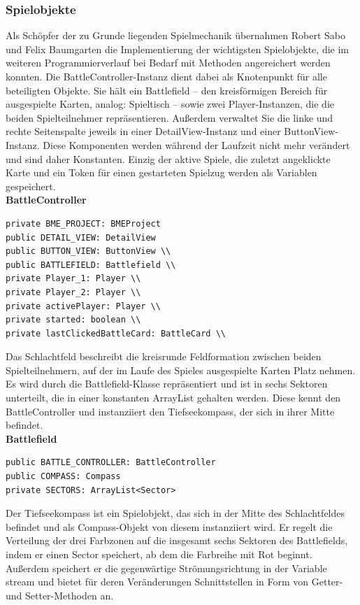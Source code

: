 \subsubsection{Spielobjekte}
Als Schöpfer der zu Grunde liegenden Spielmechanik übernahmen Robert Sabo und Felix Baumgarten die Implementierung der wichtigsten Spielobjekte, die im weiteren Programmierverlauf bei Bedarf mit Methoden angereichert werden konnten.
Die BattleController-Instanz dient dabei als Knotenpunkt für alle beteiligten Objekte. Sie hält ein Battlefield – den kreisförmigen Bereich für ausgespielte Karten, analog: Spieltisch – sowie zwei Player-Instanzen, die die beiden Spielteilnehmer repräsentieren. Außerdem verwaltet Sie die linke und rechte Seitenspalte jeweils in einer DetailView-Instanz und einer ButtonView-Instanz. Diese Komponenten werden während der Laufzeit nicht mehr verändert und sind daher Konstanten. Einzig der aktive Spiele, die zuletzt angeklickte Karte und ein Token für einen gestarteten Spielzug werden als Variablen gespeichert.
\\
\textbf{BattleController}
\begin{lstlisting}[frame=single]
private BME_PROJECT: BMEProject 
public DETAIL_VIEW: DetailView 
public BUTTON_VIEW: ButtonView \\
public BATTLEFIELD: Battlefield \\
private Player_1: Player \\
private Player_2: Player \\
private activePlayer: Player \\
private started: boolean \\
private lastClickedBattleCard: BattleCard \\
\end{lstlisting}

Das Schlachtfeld beschreibt die kreisrunde Feldformation zwischen beiden Spielteilnehmern, auf der im Laufe des Spieles ausgespielte Karten Platz nehmen. Es wird durch die Battlefield-Klasse repräsentiert und ist in sechs Sektoren unterteilt, die in einer konstanten ArrayList gehalten werden. Diese kennt den BattleController und instanziiert den Tiefseekompass, der sich in ihrer Mitte befindet.
\\
\textbf{Battlefield}
\begin{lstlisting}[frame=single]
public BATTLE_CONTROLLER: BattleController 
public COMPASS: Compass
private SECTORS: ArrayList<Sector>
\end{lstlisting}

Der Tiefseekompass ist ein Spielobjekt, das sich in der Mitte des Schlachtfeldes befindet und als Compass-Objekt von diesem instanziiert wird. Er regelt die Verteilung der drei Farbzonen auf die insgesamt sechs Sektoren des Battlefields, indem er einen Sector speichert, ab dem die Farbreihe mit Rot beginnt. Außerdem speichert er die gegenwärtige Strömungsrichtung in der Variable stream und bietet für deren Veränderungen Schnittstellen in Form von Getter- und Setter-Methoden an.

